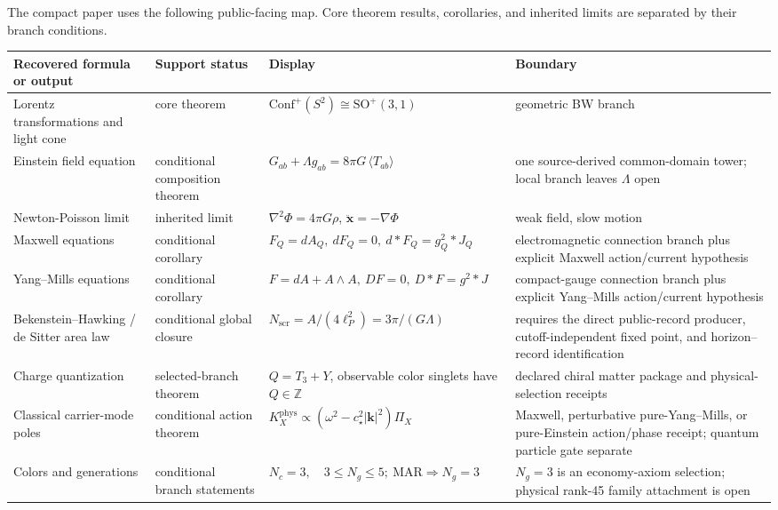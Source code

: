 \documentclass[11pt]{article}
\begin{document}
The compact paper uses the following public-facing map. Core theorem results, corollaries, and
inherited limits are separated by their branch conditions.

\begingroup
\footnotesize
\begin{longtable}{@{}>{\raggedright\arraybackslash}p{}>{\raggedright\arraybackslash}p{}>{\raggedright\arraybackslash}p{}>{\raggedright\arraybackslash}p{}@{}}
\toprule
Recovered formula or output & Support status & Display & Boundary \\
\midrule
\endhead
\bottomrule
\endfoot
Lorentz transformations and light cone & core theorem & \(\mathrm{Conf}^+(S^2)\cong\mathrm{SO}^+(3,1)\) & geometric BW branch \\
Einstein field equation & conditional composition theorem & \(G_{ab}+\Lambda g_{ab}=8\pi G\,\langle T_{ab}\rangle\) & one source-derived common-domain tower; local branch leaves \(\Lambda\) open \\
Newton-Poisson limit & inherited limit & \(\nabla^2\Phi=4\pi G\rho\), \(\ddot{\mathbf x}=-\nabla\Phi\) & weak field, slow motion \\
Maxwell equations & conditional corollary & \(F_Q=dA_Q,\ dF_Q=0,\ d{*}F_Q=g_Q^2{*}J_Q\) & electromagnetic connection branch plus explicit Maxwell action/current hypothesis \\
Yang--Mills equations & conditional corollary & \(F=dA+A\wedge A,\ DF=0,\ D{*}F=g^2{*}J\) & compact-gauge connection branch plus explicit Yang--Mills action/current hypothesis \\
Bekenstein--Hawking / de Sitter area law & conditional global closure & \(N_{\mathrm{scr}}=A/(4\ell_P^2)=3\pi/(G\Lambda)\) & requires the direct public-record producer, cutoff-independent fixed point, and horizon--record identification \\
Charge quantization & selected-branch theorem & \(Q=T_3+Y\), observable color singlets have \(Q\in\mathbb Z\) & declared chiral matter package and physical-selection receipts \\
Classical carrier-mode poles & conditional action theorem & \(K_X^{\mathrm{phys}}\propto(\omega^2-c_\star^2|\mathbf k|^2)\Pi_X\) & Maxwell, perturbative pure-Yang--Mills, or pure-Einstein action/phase receipt; quantum particle gate separate \\
Colors and generations & conditional branch statements & \(N_c=3,\quad 3\le N_g\le5;\ \mathrm{MAR}\Rightarrow N_g=3\) & \(N_g=3\) is an economy-axiom selection; physical rank-45 family attachment is open \\
\end{longtable}
\endgroup
\end{document}
